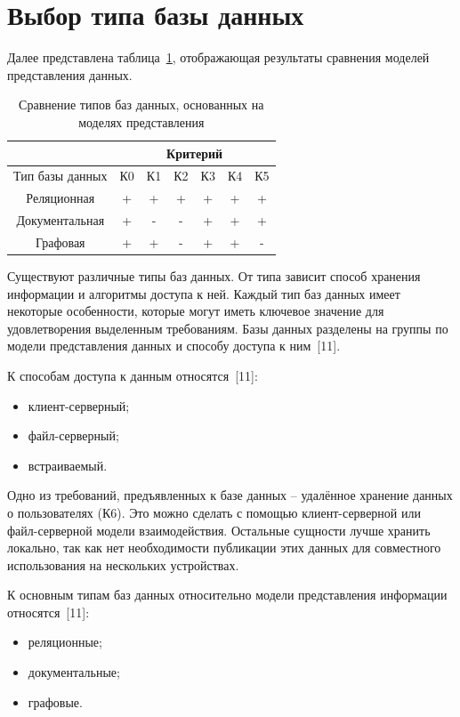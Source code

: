 \section{Выбор типа базы данных}
Далее представлена таблица~\ref{table:cmp_model}, отображающая результаты сравнения моделей представления данных.
\begin{table}[h!]
    \centering
    \begin{tabular} { |c|c|c|c|c|c|c| }
        \hline
        \hspace{0pt} & \multicolumn{6}{|c|}{Критерий} \\
        \hline
        Тип базы данных & К0 & К1 & К2 & К3 & К4 & К5 \\
        \hline
        Реляционная & + & + & + & + & + & + \\
        \hline
        Документальная & + & - & - & + & + & + \\
        \hline
        Графовая & + & + & - & + & + & - \\
        \hline
        \end{tabular}
    \caption{\centering Сравнение типов баз данных, основанных на моделях представления}
    \label{table:cmp_model}
\end{table}
Существуют различные типы баз данных.
От типа зависит способ хранения информации и алгоритмы доступа к ней.
Каждый тип баз данных имеет некоторые особенности, которые могут иметь ключевое значение для удовлетворения выделенным требованиям.
Базы данных разделены на группы по модели представления данных и способу доступа к ним~[11].

К способам доступа к данным относятся~[11]:
\begin{itemize}
    \item клиент-серверный;
    \item файл-серверный;
    \item встраиваемый.
\end{itemize}

Одно из требований, предъявленных к базе данных -- удалённое хранение данных о пользователях (К6).
Это можно сделать с помощью клиент-серверной или файл-серверной модели взаимодействия.
Остальные сущности лучше хранить локально, так как нет необходимости публикации этих данных для совместного использования на нескольких устройствах.

К основным типам баз данных относительно модели представления информации относятся~[11]:
\begin{itemize}
    \item реляционные;
    \item документальные;
    \item графовые.
\end{itemize}

